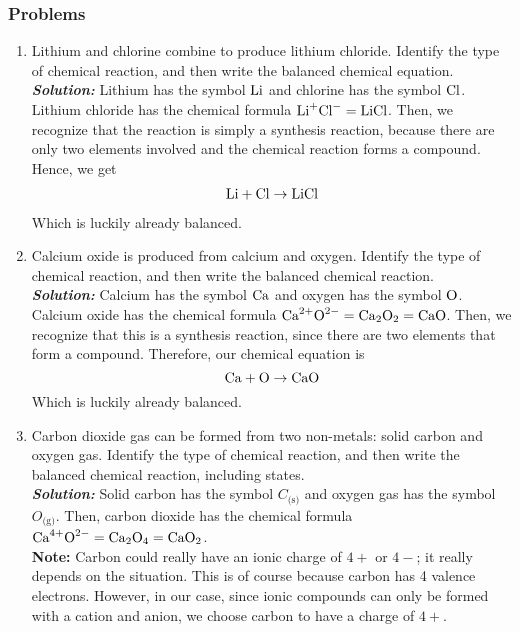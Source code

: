 \documentclass[12pt]{report}
\begin{document}
\subsubsection{Problems}
\begin{enumerate}
\setlength\itemsep{1em}
    \item{Lithium and chlorine combine to produce lithium chloride. Identify the type of chemical reaction, and then write the balanced chemical equation.}\\

        \textit{ \textbf{Solution:} }Lithium has the symbol $ \ce{Li}$ and chlorine has the symbol $ \ce{Cl}$. Lithium chloride has the chemical formula $ \text{Li}^{+} \text{Cl}^{-}= \ce{LiCl}$. Then, we recognize that the reaction is simply a synthesis reaction, because there are only two elements involved and the chemical reaction forms a compound. Hence, we get 
        \begin{align*}
            \ce{Li}+ \ce{Cl} \to \ce{LiCl}
        \end{align*}
    Which is luckily already balanced.

    \item{Calcium oxide is produced from calcium and oxygen. Identify the type of chemical reaction, and then write the balanced chemical reaction.}\\

        \textit{ \textbf{Solution:}} Calcium has the symbol $ \ce{Ca}$ and oxygen has the symbol $ \ce{O}$. Calcium oxide has the chemical formula $ \text{Ca}^{2+} \text{O}^{2-}= \ce{Ca2O2}= \ce{CaO}$. Then, we recognize that this is a synthesis reaction, since there are two elements that form a compound. Therefore, our chemical equation is 
        \[
            \ce{Ca}+ \ce{O}\to \ce{CaO}
        \]
    Which is luckily already balanced.

    \item{Carbon dioxide gas can be formed from two non-metals: solid carbon and oxygen gas. Identify the type of chemical reaction, and then write the balanced chemical reaction, including states.}\\

        \textit{ \textbf{Solution:}} Solid carbon has the symbol $C_{\text{(s)}}$ and oxygen gas has the symbol $O_{\text{(g)}}$. Then, carbon dioxide has the chemical formula $ \text{Ca}^{4+} \text{O}^{2-}= \ce{Ca2O4}= \ce{CaO2}$.\\

    \textbf{Note:} Carbon could really have an ionic charge of $4+$ or $4-$; it really depends on the situation. This is of course because carbon has 4 valence electrons. However, in our case, since ionic compounds can only be formed with a cation and anion, we choose carbon to have a charge of $4+$.\\


\end{enumerate}
\end{document}
